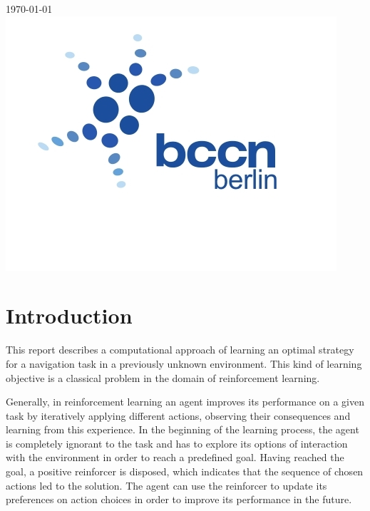 \begin{titlepage}
{\large \today}\\[2cm] %


\includegraphics[scale=.5]{figures/logo.jpg}\\[1cm] %
 

\vfill %

\end{titlepage}

\section{Introduction}
\label{sec:intro}
This report describes a computational approach of learning an optimal strategy for a navigation task in a previously unknown environment. This kind of learning objective is a classical problem in the domain of reinforcement learning. 

Generally, in reinforcement learning an agent improves its performance on a given task by iteratively applying different actions, observing their consequences and learning from this experience. In the beginning of the learning process, the agent is completely ignorant to the task and has to explore its options of interaction with the environment in order to reach a predefined goal. Having reached the goal, a positive reinforcer is disposed, which indicates that the sequence of chosen actions led to the solution. The agent can use the reinforcer to update its preferences on action choices in order to improve its performance in the future. 

